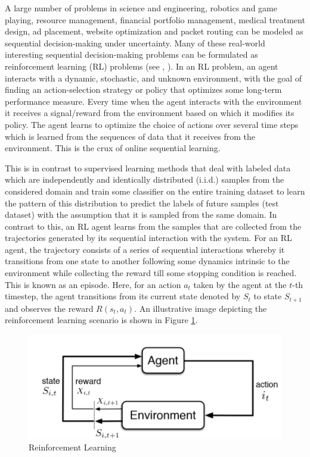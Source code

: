 A large number of problems in science and engineering, robotics and game playing, resource management, financial portfolio management, medical treatment design, ad placement, website optimization and packet routing can be modeled as sequential decision-making under uncertainty. Many of these real-world interesting
sequential decision-making problems can be formulated as reinforcement learning (RL) problems (see \citep{bertsekas1996neuro}, \citep{sutton1998reinforcement}). In an RL problem, an agent interacts with a dynamic, stochastic, and unknown environment, with the goal of finding an action-selection strategy or policy that optimizes some long-term performance measure. Every time when the agent interacts with the environment it receives a signal/reward from the environment based on which it modifies its policy. The agent learns to optimize the choice of actions over several time steps which is learned from the sequences of data that it receives from the environment. This is the crux of online sequential learning. 

    This is in contrast to supervised learning methods that deal with labeled data which are independently and identically distributed (i.i.d.) samples from the considered domain and train some classifier on the entire training dataset to learn the pattern of this distribution to predict the labels of future samples (test dataset) with the assumption that it is sampled from the same domain. In contrast to this, an RL agent learns from the samples that are collected from the trajectories generated by its sequential interaction with the system. For an RL agent, the trajectory consists of a series of sequential interactions whereby it transitions from one state to another following some dynamics intrinsic to the environment while collecting the reward till some stopping condition is reached. This is known as an episode. Here, for an action $a_t$ taken by the agent at the $t$-th timestep, the agent transitions from its current state denoted by $S_{t}$ to state $S_{t+1}$ and observes the reward $R(s_t,a_t)$. An illustrative image depicting the reinforcement learning scenario is shown in Figure \ref{fig:rl}.

\begin{figure}[!th]
\includegraphics[scale=0.4]{img/RL1.png}
\caption{Reinforcement Learning}
\label{fig:rl}
\end{figure}

